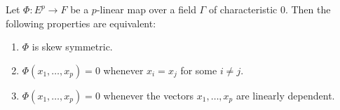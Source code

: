 Let $\Phi: E^p \to F$ be a $p$-linear map over a field $\Gamma$ of characteristic $0$. Then the following properties are equivalent:
\begin{enumerate}
\item[(i)] $\Phi$ is skew symmetric.
\item[(ii)] $\Phi(x_1, \ldots, x_p) = 0$ whenever $x_i = x_j$ for some $i \neq j$.
\item[(iii)] $\Phi(x_1, \ldots, x_p) = 0$ whenever the vectors $x_1, \ldots, x_p$ are linearly dependent.
\end{enumerate}
